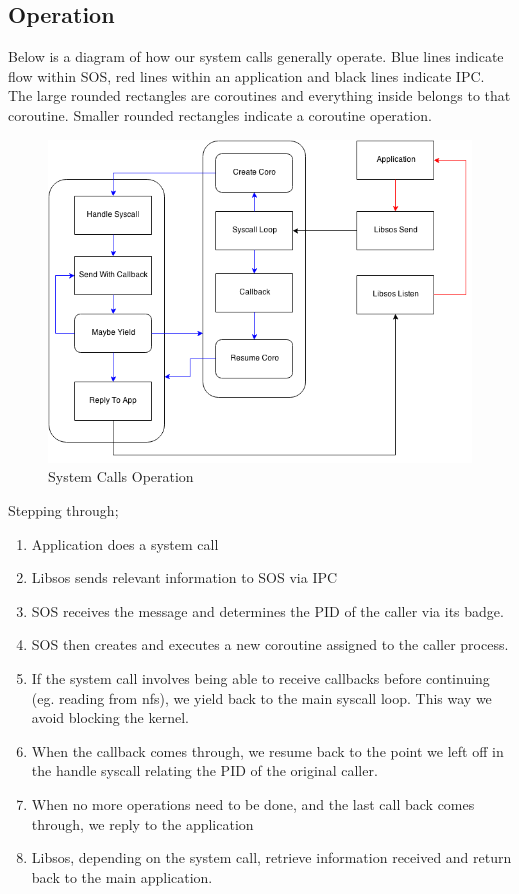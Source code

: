 \documentclass[12pt]{article}
\begin{document}
\subsection{Operation}
Below is a diagram of how our system calls generally operate. Blue lines indicate flow within SOS, red lines within an application and black lines indicate IPC. The large rounded rectangles are coroutines and everything inside belongs to that coroutine. Smaller rounded rectangles indicate a coroutine operation. 
\begin{figure}[htbp]
\centering
\includegraphics[scale=0.6]{System_Calls_Type2}
\caption{System Calls Operation}
\end{figure}

Stepping through;
\begin{enumerate}
\item Application does a system call
\item Libsos sends relevant information to SOS via IPC
\item SOS receives the message and determines the PID of the caller via its badge.
\item SOS then creates and executes a new coroutine assigned to the caller process.
\item If the system call involves being able to receive callbacks before continuing (eg. reading from nfs), we yield back to the main syscall loop. This way we avoid blocking the kernel.
\item When the callback comes through, we resume back to the point we left off in the handle syscall relating the PID of the original caller.
\item When no more operations need to be done, and the last call back comes through, we reply to the application
\item Libsos, depending on the system call, retrieve information received and return back to the main application.
\end{enumerate}
\end{document}
